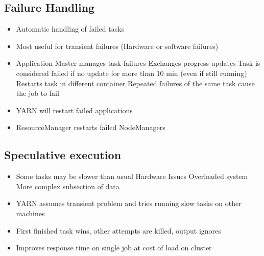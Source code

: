 \documentclass[10pt,a4paper]{scrreprt}
\begin{document}
\subsection{Failure Handling}
\begin{itemize}
	\item Automatic handling of failed tasks
	\item Most useful for transient failures (Hardware or software failures)
	\item Application Master manages task failures
	\subitem Exchanges progress updates
	\subitem Task is considered failed if no update for more than 10 min (even if still running)
	\subitem Restarts task in different container
	\subitem Repeated failures of the same task cause the job to fail
	\item YARN will restart failed applications
	\item ResourceManager restarts failed NodeManagers
\end{itemize}

\subsection{Speculative execution}
\begin{itemize}
	\item Some tasks may be slower than usual
	\subitem Hardware Issues
	\subitem Overloaded system
	\subitem More complex subsection of data
	\item YARN assumes transient problem and tries running slow tasks on other machines
	\item First finished task wins, other attempts are killed, output ignores
	\item Improves response time on single job at cost of load on cluster
\end{itemize}
\end{document}
